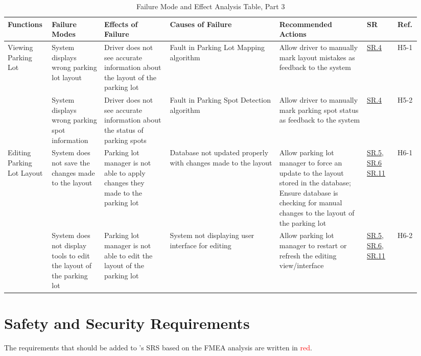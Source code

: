 \documentclass[12pt,letterpaper]{article}
\begin{document}
\begin{landscape}
\begin{table}[hp]
\begin{tabular}{|p{0.09\linewidth}|p{0.12\linewidth}|p{0.15\linewidth}|p{0.25\linewidth}|p{0.2\linewidth}|p{0.075\linewidth}|p{0.05\linewidth}|}
\hline
Functions & Failure Modes & Effects of Failure & Causes of Failure & Recommended
Actions & SR & Ref.\\
\hline
Viewing Parking Lot & System displays wrong parking lot layout & Driver does not
see accurate information about the layout of the parking lot & Fault in Parking
Lot Mapping algorithm & Allow driver to manually mark layout mistakes as
feedback to the system & \hyperref[isr4]{SR.4} & H5-1\\\cline{2-7} & System
displays wrong parking spot information & Driver does not see accurate
information about the status of parking spots & Fault in Parking Spot Detection
algorithm & Allow driver to manually mark parking spot status as feedback to the
system & \hyperref[isr4]{SR.4} & H5-2\\
\hline
Editing Parking Lot Layout & System does not save the changes made to the layout
& Parking lot manager is not able to apply changes they made to the parking lot
& Database not updated properly with changes made to the layout & Allow parking
lot manager to force an update to the layout stored in the database; Ensure
database is checking for manual changes to the layout of the parking lot &
\hyperref[isr5]{SR.5}, \hyperref[isr6]{SR.6} \hyperref[isr11]{SR.11} &
H6-1\\\cline{2-7} & System does not display tools to edit the layout of the
parking lot & Parking lot manager is not able to edit the layout of the parking
lot & System not displaying user interface for editing & Allow parking lot
manager to restart or refresh the editing view/interface &
\hyperref[isr5]{SR.5}, \hyperref[isr6]{SR.6}, \hyperref[isr11]{SR.11} & H6-2\\
\hline
\end{tabular}
\caption{Failure Mode and Effect Analysis Table, Part 3} \label{TblFMEA3}
\end{table}

\end{landscape}

\newpage

\restoregeometry

\section{Safety and Security Requirements}
The requirements that should be added to \progname's SRS based on the FMEA
analysis are written in \textcolor{red}{red}.
\end{document}
